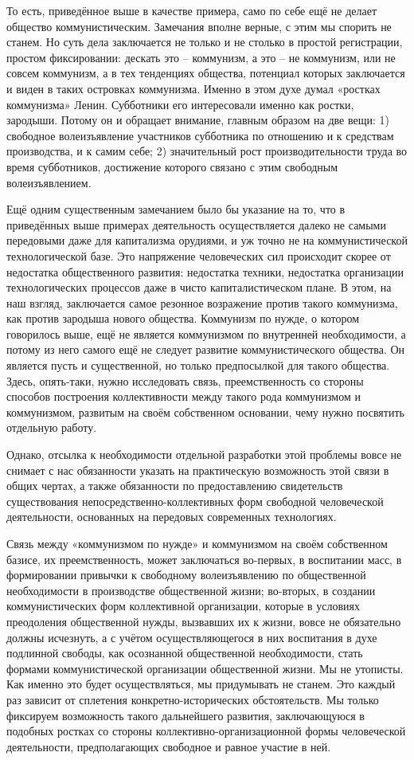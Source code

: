 \documentclass[12pt,a4paper,openany]{book}
\begin{document}
То есть, приведённое выше в качестве примера, само по себе ещё не делает общество коммунистическим. Замечания вполне верные, с этим мы спорить не станем. Но суть дела заключается не только и не столько в простой регистрации, простом фиксировании: дескать это – коммунизм, а это – не коммунизм, или не совсем коммунизм, а в тех тенденциях общества, потенциал которых заключается и виден в таких островках коммунизма. Именно в этом духе думал «ростках коммунизма» Ленин. Субботники его интересовали именно как ростки, зародыши. Потому он и обращает внимание, главным образом на две вещи: 1) свободное волеизъявление участников субботника по отношению и к средствам производства, и к самим себе; 2) значительный рост производительности труда во время субботников, достижение которого связано с этим свободным волеизъявлением.

Ещё одним существенным замечанием было бы указание на то, что в приведённых выше примерах деятельность осуществляется далеко не самыми передовыми даже для капитализма орудиями, и уж точно не на коммунистической технологической базе. Это напряжение человеческих сил происходит скорее от недостатка общественного развития: недостатка техники, недостатка организации технологических процессов даже в чисто капиталистическом плане. В этом, на наш взгляд, заключается самое резонное возражение против такого коммунизма, как против зародыша нового общества. Коммунизм по нужде, о котором говорилось выше, ещё не является коммунизмом по внутренней необходимости, а потому из него самого ещё не следует развитие коммунистического общества. Он является пусть и существенной, но только предпосылкой для такого общества. Здесь, опять-таки, нужно исследовать связь, преемственность со стороны способов построения коллективности между такого рода коммунизмом и коммунизмом, развитым на своём собственном основании, чему нужно посвятить отдельную работу.

Однако, отсылка к необходимости отдельной разработки этой проблемы вовсе не снимает с нас обязанности указать на практическую возможность этой связи в общих чертах, а также обязанности по предоставлению свидетельств существования непосредственно-коллективных форм свободной человеческой деятельности, основанных на передовых современных технологиях.

Связь между «коммунизмом по нужде» и коммунизмом на своём собственном базисе, их преемственность, может заключаться во-первых, в воспитании масс, в формировании привычки к свободному волеизъявлению по общественной необходимости в производстве общественной жизни; во-вторых, в создании коммунистических форм коллективной организации, которые в условиях преодоления общественной нужды, вызвавших их к жизни, вовсе не обязательно должны исчезнуть, а с учётом осуществляющегося в них воспитания в духе подлинной свободы, как осознанной общественной необходимости, стать формами коммунистической организации общественной жизни. Мы не утописты. Как именно это будет осуществляться, мы придумывать не станем. Это каждый раз зависит от сплетения конкретно-исторических обстоятельств. Мы только фиксируем возможность такого дальнейшего развития, заключающуюся в подобных ростках со стороны коллективно-организационной формы человеческой деятельности, предполагающих свободное и равное участие в ней.
\end{document}

